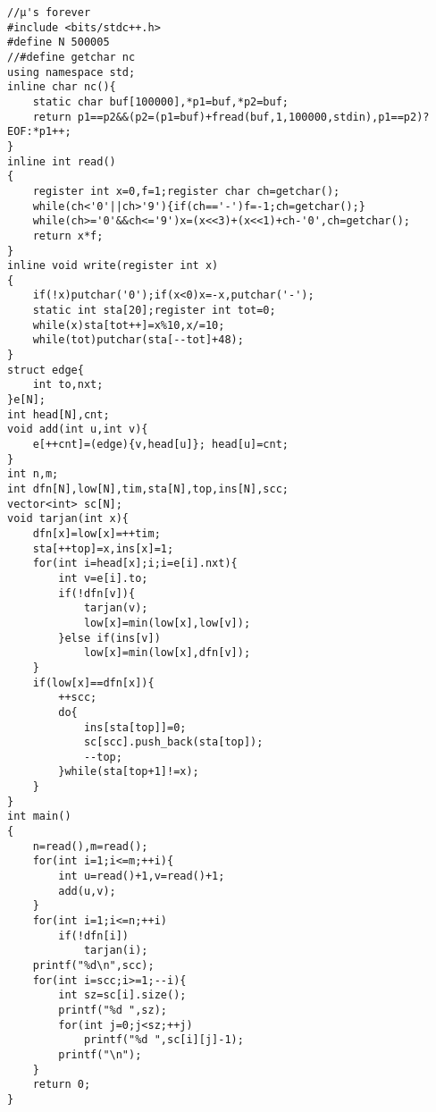 \begin{verbatim}
//μ's forever
#include <bits/stdc++.h>
#define N 500005
//#define getchar nc
using namespace std;
inline char nc(){
    static char buf[100000],*p1=buf,*p2=buf;
    return p1==p2&&(p2=(p1=buf)+fread(buf,1,100000,stdin),p1==p2)?EOF:*p1++;
}
inline int read()
{
    register int x=0,f=1;register char ch=getchar();
    while(ch<'0'||ch>'9'){if(ch=='-')f=-1;ch=getchar();}
    while(ch>='0'&&ch<='9')x=(x<<3)+(x<<1)+ch-'0',ch=getchar();
    return x*f;
}
inline void write(register int x)
{
    if(!x)putchar('0');if(x<0)x=-x,putchar('-');
    static int sta[20];register int tot=0;
    while(x)sta[tot++]=x%10,x/=10;
    while(tot)putchar(sta[--tot]+48);
}
struct edge{
    int to,nxt;
}e[N];
int head[N],cnt;
void add(int u,int v){
    e[++cnt]=(edge){v,head[u]}; head[u]=cnt;
}
int n,m;
int dfn[N],low[N],tim,sta[N],top,ins[N],scc;
vector<int> sc[N];
void tarjan(int x){
    dfn[x]=low[x]=++tim;
    sta[++top]=x,ins[x]=1;
    for(int i=head[x];i;i=e[i].nxt){
        int v=e[i].to;
        if(!dfn[v]){
            tarjan(v);
            low[x]=min(low[x],low[v]);
        }else if(ins[v])
            low[x]=min(low[x],dfn[v]);
    }
    if(low[x]==dfn[x]){
        ++scc;
        do{
            ins[sta[top]]=0;
            sc[scc].push_back(sta[top]);
            --top;
        }while(sta[top+1]!=x);
    }
}
int main()
{
    n=read(),m=read();
    for(int i=1;i<=m;++i){
        int u=read()+1,v=read()+1;
        add(u,v);
    }
    for(int i=1;i<=n;++i)
        if(!dfn[i])
            tarjan(i);
    printf("%d\n",scc);
    for(int i=scc;i>=1;--i){
        int sz=sc[i].size();
        printf("%d ",sz);
        for(int j=0;j<sz;++j)
            printf("%d ",sc[i][j]-1);
        printf("\n");
    }
    return 0;
}
\end{verbatim}
